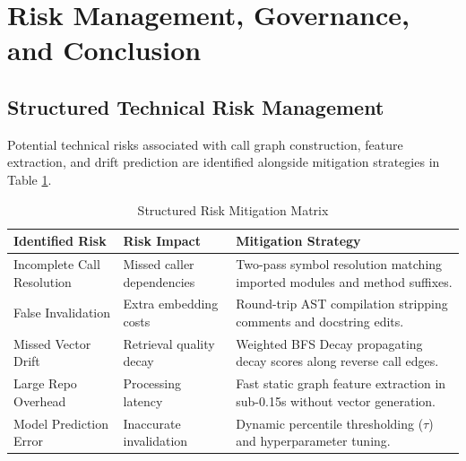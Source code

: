 \documentclass[conference]{IEEEtran}
\begin{document}
\section{Risk Management, Governance, and Conclusion}

\subsection{Structured Technical Risk Management}
Potential technical risks associated with call graph construction, feature extraction, and drift prediction are identified alongside mitigation strategies in Table \ref{tab:risk_matrix}.

\begin{table}[htbp]
\caption{Structured Risk Mitigation Matrix}
\label{tab:risk_matrix}
\centering
\begin{tabular}{p{2.2cm}p{1.8cm}p{3.2cm}}
\toprule
\textbf{Identified Risk} & \textbf{Risk Impact} & \textbf{Mitigation Strategy} \\
\midrule
Incomplete Call Resolution & Missed caller dependencies & Two-pass symbol resolution matching imported modules and method suffixes. \\
False Invalidation & Extra embedding costs & Round-trip AST compilation stripping comments and docstring edits. \\
Missed Vector Drift & Retrieval quality decay & Weighted BFS Decay propagating decay scores along reverse call edges. \\
Large Repo Overhead & Processing latency & Fast static graph feature extraction in sub-0.15s without vector generation. \\
Model Prediction Error & Inaccurate invalidation & Dynamic percentile thresholding ($\tau$) and hyperparameter tuning. \\
\bottomrule
\end{tabular}
\end{table}
\end{document}
